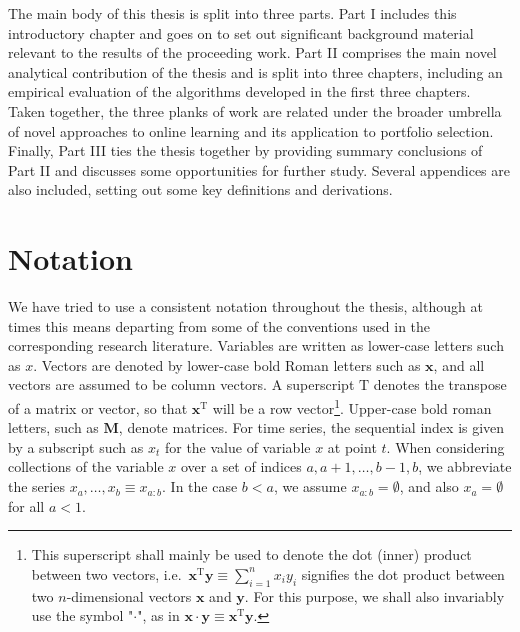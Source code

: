 The main body of this thesis is split into three parts. Part I includes this introductory chapter and goes on to set out significant background material relevant to the results of the proceeding work. Part II comprises the main novel analytical contribution of the thesis and is split into three chapters, including an empirical evaluation of the algorithms developed in the first three chapters. Taken together, the three planks of work are related under the broader umbrella of novel approaches to online learning and its application to portfolio selection. Finally, Part III ties the thesis together by providing summary conclusions of Part II and discusses some opportunities for further study. Several appendices are also included, setting out some key definitions and derivations.




\section{Notation}

We have tried to use a consistent notation throughout the thesis, although at times this means departing from some of the conventions used in the corresponding research literature. Variables are written as lower-case letters such as $x$. Vectors are denoted by lower-case bold Roman letters such as $\mathbf{x}$, and all vectors are assumed to be column vectors. A superscript $\text{T}$ denotes the transpose of a matrix or vector, so that $\mathbf{x}^\text{T}$ will be a row vector\footnote{This superscript shall mainly be used to denote the dot (inner) product between two vectors, i.e.\ $\mathbf{x}^\text{T}\mathbf{y} \equiv \sum_{i=1}^n x_{i}y_{i}$ signifies the dot product between two $n$-dimensional vectors $\mathbf{x}$ and $\mathbf{y}$. For this purpose, we shall also invariably use the symbol "$\cdot$", as in $\mathbf{x} \cdot \mathbf{y} \equiv \mathbf{x}^\text{T}\mathbf{y}$.}. Upper-case bold roman letters, such as $\mathbf{M}$, denote matrices. For time
series, the sequential index is given by a subscript such as $x_{t}$ for the value of variable $x$ at point $t$. When considering collections of the variable $x$ over a set of indices ${a, a + 1, \ldots, b-1, b}$, we abbreviate the series $x_a, \ldots, x_b \equiv x_{a:b}$. In the case $b < a$, we assume $x_{a:b} = \emptyset$, and also $x_a = \emptyset$ for all $a < 1$.

